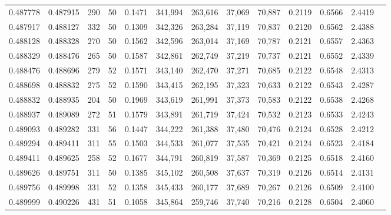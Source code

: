 \begin{tabular}{rrrrrrrrrrrrr}
0.487778 & 0.487915 &   290 &  50 &                                     0.1471 & 341,994 & 263,616 &  37,069 &  70,887 & 0.2119 & 0.6566 & 2.4419 \\
0.487917 & 0.488127 &   332 &  50 &                                     0.1309 & 342,326 & 263,284 &  37,119 &  70,837 & 0.2120 & 0.6562 & 2.4388 \\
0.488128 & 0.488328 &   270 &  50 &                                     0.1562 & 342,596 & 263,014 &  37,169 &  70,787 & 0.2121 & 0.6557 & 2.4363 \\
0.488329 & 0.488476 &   265 &  50 &                                     0.1587 & 342,861 & 262,749 &  37,219 &  70,737 & 0.2121 & 0.6552 & 2.4339 \\
0.488476 & 0.488696 &   279 &  52 &                                     0.1571 & 343,140 & 262,470 &  37,271 &  70,685 & 0.2122 & 0.6548 & 2.4313 \\
0.488698 & 0.488832 &   275 &  52 &                                     0.1590 & 343,415 & 262,195 &  37,323 &  70,633 & 0.2122 & 0.6543 & 2.4287 \\
0.488832 & 0.488935 &   204 &  50 &                                     0.1969 & 343,619 & 261,991 &  37,373 &  70,583 & 0.2122 & 0.6538 & 2.4268 \\
0.488937 & 0.489089 &   272 &  51 &                                     0.1579 & 343,891 & 261,719 &  37,424 &  70,532 & 0.2123 & 0.6533 & 2.4243 \\
0.489093 & 0.489282 &   331 &  56 &                                     0.1447 & 344,222 & 261,388 &  37,480 &  70,476 & 0.2124 & 0.6528 & 2.4212 \\
0.489294 & 0.489411 &   311 &  55 &                                     0.1503 & 344,533 & 261,077 &  37,535 &  70,421 & 0.2124 & 0.6523 & 2.4184 \\
0.489411 & 0.489625 &   258 &  52 &                                     0.1677 & 344,791 & 260,819 &  37,587 &  70,369 & 0.2125 & 0.6518 & 2.4160 \\
0.489626 & 0.489751 &   311 &  50 &                                     0.1385 & 345,102 & 260,508 &  37,637 &  70,319 & 0.2126 & 0.6514 & 2.4131 \\
0.489756 & 0.489998 &   331 &  52 &                                     0.1358 & 345,433 & 260,177 &  37,689 &  70,267 & 0.2126 & 0.6509 & 2.4100 \\
0.489999 & 0.490226 &   431 &  51 &                                     0.1058 & 345,864 & 259,746 &  37,740 &  70,216 & 0.2128 & 0.6504 & 2.4060 \\

\end{tabular}

